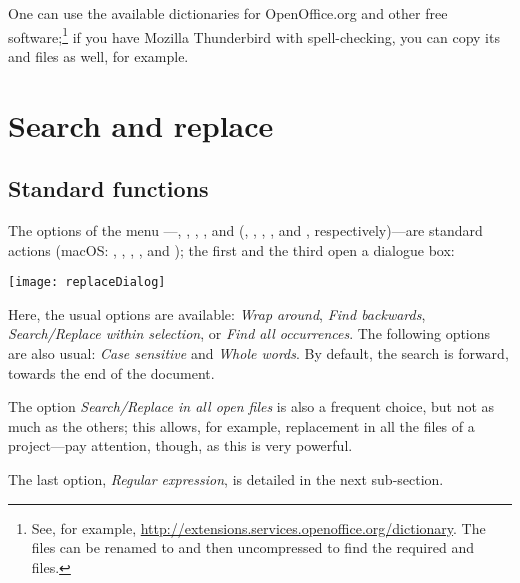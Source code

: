 One can use the available dictionaries for OpenOffice.org and other free software;\footnote{See, for example, \url{http://extensions.services.openoffice.org/dictionary}. The  files can be renamed to  and then uncompressed to find the required  and  files.} if you have Mozilla Thunderbird with spell-checking, you can copy its  and  files as well, for example.

\section{Search and replace}

\subsection{Standard functions}

The options of the menu ---, , , , and  (, , , , and , respectively)---are standard actions (macOS: , , , , and ); the first and the third open a dialogue box:

\begin{center}
\texttt{[image: replaceDialog]}
\end{center}

Here, the usual options are available: \emph{Wrap around}, \emph{Find backwards}, \emph{Search/Replace within selection}, or \emph{Find all occurrences}. The following options are also usual: \emph{Case sensitive} and \emph{Whole words}. By default, the search is forward, towards the end of the document.

The option \emph{Search/Replace in all open files} is also a frequent choice, but not as much as the others; this allows, for example, replacement in all the files of a project---pay attention, though, as this is very powerful.

The last option, \emph{Regular expression}, is detailed in the next sub-section.

